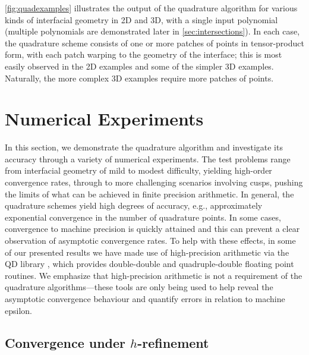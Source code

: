 \documentclass[onefignum,onetabnum,onealgnum,oneeqnum]{siamart190516}
\begin{document}
\cref{fig:quadexamples} illustrates the output of the quadrature algorithm for various kinds of interfacial geometry in 2D and 3D, with a single input polynomial (multiple polynomials are demonstrated later in \cref{sec:intersections}). In each case, the quadrature scheme consists of one or more patches of points in tensor-product form, with each patch warping to the geometry of the interface; this is most easily observed in the 2D examples and some of the simpler 3D examples. Naturally, the more complex 3D examples require more patches of points. 
%



\section{Numerical Experiments}
\label{sec:results}

In this section, we demonstrate the quadrature algorithm and investigate its accuracy through a variety of numerical experiments. The test problems range from interfacial geometry of mild to modest difficulty, yielding high-order convergence rates, through to more challenging scenarios involving cusps, pushing the limits of what can be achieved in finite precision arithmetic. In general, the quadrature schemes yield high degrees of accuracy, e.g., approximately exponential convergence in the number of quadrature points. In some cases, convergence to machine precision is quickly attained and this can prevent a clear observation of asymptotic convergence rates. %
To help with these effects, in some of our presented results we have made use of high-precision arithmetic via the QD library \cite{qdlib}, which provides double-double and quadruple-double floating point routines. We emphasize that high-precision arithmetic is not a requirement of the quadrature algorithms---these tools are only being used to help reveal the asymptotic convergence behaviour and quantify errors in relation to machine epsilon.

\subsection{Convergence under \texorpdfstring{$h$}{h}-refinement}
\label{sec:ellipse}
\end{document}
